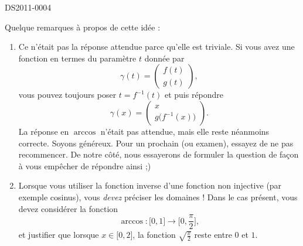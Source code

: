 \begin{corrige}{DS2011-0004}
   
    Quelque remarques à propos de cette idée :
    \begin{enumerate}
        \item
            Ce n'était pas la réponse attendue parce qu'elle est triviale. Si vous avez une fonction en termes du paramètre \( t\) donnée par
            \begin{equation}
                \gamma(t)=\begin{pmatrix}
                    f(t)    \\ 
                    g(t)    
                \end{pmatrix},
            \end{equation}
            vous pouvez toujours poser \( t=f^{-1}(t)\) et puis répondre
            \begin{equation}
                \gamma(x)=\begin{pmatrix}
                    x    \\ 
                    g\big( f^{-1}(x) \big)    
                \end{pmatrix}.
            \end{equation}
            La réponse en \( \arccos\) n'était pas attendue, mais elle reste néanmoins correcte. Soyons généreux. Pour un prochain (ou examen), essayez de ne pas recommencer. De notre côté, nous essayerons de formuler la question de façon à vous empêcher de répondre ainsi ;)

        \item
            Lorsque vous utiliser la fonction inverse d'une fonction non injective (par exemple cosinus), vous \emph{devez} préciser les domaines ! Dans le cas présent, vous devez considérer la fonction
            \begin{equation}
                \arccos\colon \mathopen[ 0 , 1 \mathclose]\to \mathopen[ 0 , \frac{ \pi }{2} \mathclose],
            \end{equation}
            et justifier que lorsque \( x\in\mathopen[ 0 , 2 \mathclose]\), la fonction \( \sqrt{\frac{ x }{ 2 }}\) reste entre \( 0\) et \( 1\).
    \end{enumerate}


\end{corrige}
